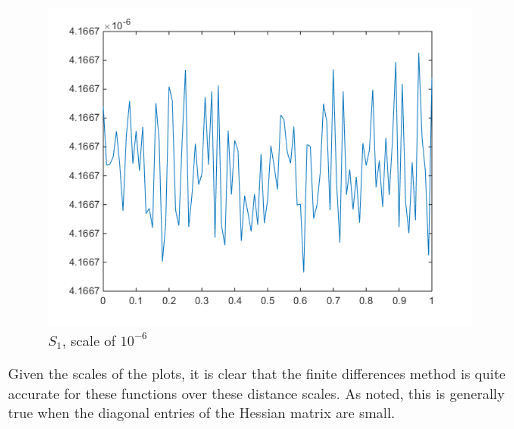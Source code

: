 \documentclass[11pt,letterpaper]{article}
\begin{document}
\begin{figure}[!htb]
  \includegraphics[width=\linewidth]{figures/gradDifS.png}
  \caption{$S_1$, scale of $10^{-6}$}\label{fig:gradDifS}
\endminipage
\end{figure}

Given the scales of the plots, it is clear that the finite differences method is quite accurate for these functions over these distance scales. As noted, this is generally true when the diagonal entries of the Hessian matrix are small.

\section{}
\end{document}
